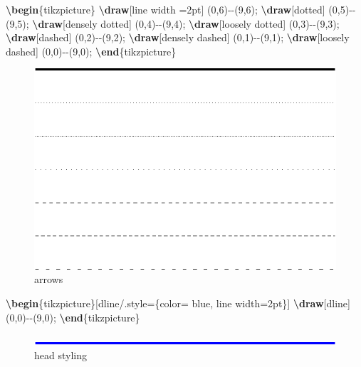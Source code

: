 \documentclass[
]{book}
\newenvironment{Shaded}{\begin{snugshade}}{\end{snugshade}}
\newcommand{\ExtensionTok}[1]{#1}
\newcommand{\FunctionTok}[1]{\textcolor[rgb]{0.13,0.29,0.53}{\textbf{#1}}}
\newcommand{\KeywordTok}[1]{\textcolor[rgb]{0.13,0.29,0.53}{\textbf{#1}}}
\newcommand{\NormalTok}[1]{#1}
\theoremstyle{definition}
\theoremstyle{definition}
\theoremstyle{definition}
\theoremstyle{definition}
\theoremstyle{remark}
\begin{document}
\begin{Shaded}
\begin{Highlighting}[]
\KeywordTok{\textbackslash{}begin}\NormalTok{\{}\ExtensionTok{tikzpicture}\NormalTok{\}}
  \FunctionTok{\textbackslash{}draw}\NormalTok{[line width =2pt] (0,6){-}{-}(9,6); }
  \FunctionTok{\textbackslash{}draw}\NormalTok{[dotted]          (0,5){-}{-}(9,5); }
  \FunctionTok{\textbackslash{}draw}\NormalTok{[densely dotted]  (0,4){-}{-}(9,4); }
  \FunctionTok{\textbackslash{}draw}\NormalTok{[loosely dotted]  (0,3){-}{-}(9,3); }
  \FunctionTok{\textbackslash{}draw}\NormalTok{[dashed]          (0,2){-}{-}(9,2); }
  \FunctionTok{\textbackslash{}draw}\NormalTok{[densely dashed]  (0,1){-}{-}(9,1); }
  \FunctionTok{\textbackslash{}draw}\NormalTok{[loosely dashed]  (0,0){-}{-}(9,0);}
\KeywordTok{\textbackslash{}end}\NormalTok{\{}\ExtensionTok{tikzpicture}\NormalTok{\}}
\end{Highlighting}
\end{Shaded}

\begin{figure}
\includegraphics[width=0.75\linewidth]{202401311000-TikZ_files/figure-latex/unnamed-chunk-41-1} \caption{arrows}\label{fig:unnamed-chunk-41}
\end{figure}

\begin{Shaded}
\begin{Highlighting}[]
\KeywordTok{\textbackslash{}begin}\NormalTok{\{}\ExtensionTok{tikzpicture}\NormalTok{\}[dline/.style=\{color= blue, line width=2pt\}]}
  \FunctionTok{\textbackslash{}draw}\NormalTok{[dline] (0,0){-}{-}(9,0); }
\KeywordTok{\textbackslash{}end}\NormalTok{\{}\ExtensionTok{tikzpicture}\NormalTok{\}}
\end{Highlighting}
\end{Shaded}

\begin{figure}
\includegraphics[width=0.75\linewidth]{202401311000-TikZ_files/figure-latex/unnamed-chunk-43-1} \caption{head styling}\label{fig:unnamed-chunk-43}
\end{figure}
\end{document}
